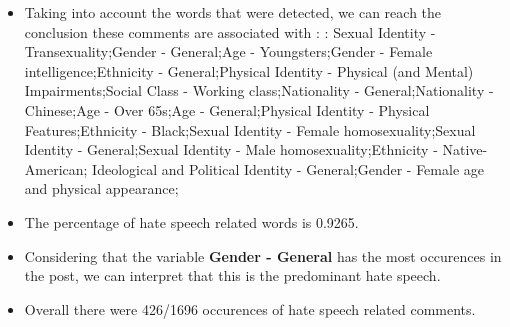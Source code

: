 \documentclass[11pt]{article}
\begin{document}
\begin{itemize}\item Taking into account the words that were detected, we can reach the conclusion these comments are associated with : : Sexual Identity - Transexuality;Gender - General;Age - Youngsters;Gender - Female intelligence;Ethnicity - General;Physical Identity - Physical (and Mental) Impairments;Social Class - Working class;Nationality - General;Nationality - Chinese;Age - Over 65s;Age - General;Physical Identity - Physical Features;Ethnicity - Black;Sexual Identity - Female homosexuality;Sexual Identity - General;Sexual Identity - Male homosexuality;Ethnicity - Native-American; Ideological and Political Identity - General;Gender - Female age and physical appearance;%

\item The percentage of hate speech related words is 0.9265.

\item Considering that the variable \textbf{Gender - General} has the most occurences in the post, we can interpret that this is the predominant hate speech.

\item Overall there were 426/1696 occurences of hate speech related comments.\end{itemize}
\end{document}
